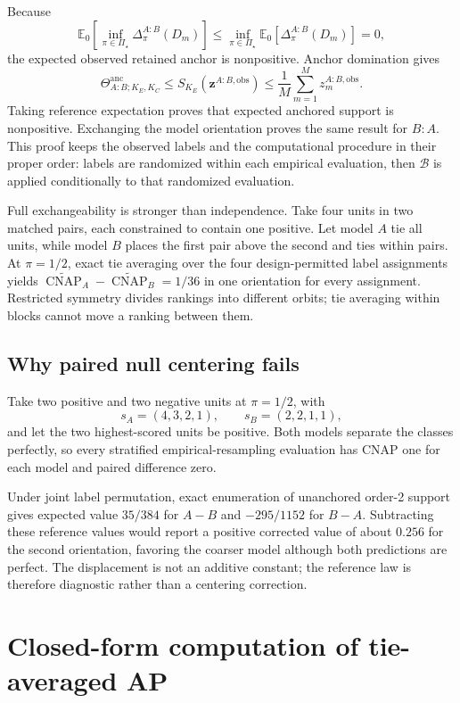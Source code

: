 \documentclass[11pt]{article}
\newcommand{\CNAP}{\operatorname{CNAP}}
\newcommand{\PSet}{\Pi_\star}
\newcommand{\Boot}{\mathcal{B}}
\newcommand{\E}{\mathbb{E}}
\newcommand{\CNAPta}{\widetilde{\CNAP}}
\newcommand{\Thetaanc}{\Theta^{\mathrm{anc}}}
\theoremstyle{remark}
\begin{document}
Because
\[
\E_0\!\left[
\inf_{\pi\in\PSet}\Delta^{A:B}_\pi(D_m)
\right]
\leq
\inf_{\pi\in\PSet}
\E_0[\Delta^{A:B}_\pi(D_m)]
=0,
\]
the expected observed retained anchor is nonpositive. Anchor domination gives
\[
\Thetaanc_{A:B;K_E,K_C}
\leq
S_{K_E}(\mathbf z^{A:B,\mathrm{obs}})
\leq
\frac1M\sum_{m=1}^Mz_m^{A:B,\mathrm{obs}}.
\]
Taking reference expectation proves that expected anchored support is
nonpositive. Exchanging the model orientation proves the same result for
$B:A$. This proof keeps the observed labels and the computational procedure in
their proper order: labels are randomized within each empirical evaluation,
then $\Boot$ is applied conditionally to that randomized evaluation.

Full exchangeability is stronger than independence. Take four units in two
matched pairs, each constrained to contain one positive. Let model $A$ tie all
units, while model $B$ places the first pair above the second and ties within
pairs. At $\pi=1/2$, exact tie averaging over the four design-permitted label
assignments yields $\CNAPta_A-\CNAPta_B=1/36$ in one orientation for every
assignment. Restricted symmetry divides rankings into different orbits; tie
averaging within blocks cannot move a ranking between them.

\subsection{Why paired null centering fails}

Take two positive and two negative units at $\pi=1/2$, with
\[
s_A=(4,3,2,1),
\qquad
s_B=(2,2,1,1),
\]
and let the two highest-scored units be positive. Both models separate the
classes perfectly, so every stratified empirical-resampling evaluation has
CNAP one for each model and paired difference zero.

Under joint label permutation, exact enumeration of unanchored order-2 support
gives expected value $35/384$ for $A-B$ and $-295/1152$ for $B-A$.
Subtracting these reference values would report a positive corrected value of
about $0.256$ for the second orientation, favoring the coarser model although
both predictions are perfect. The displacement is not an additive constant;
the reference law is therefore diagnostic rather than a centering correction.


\section{Closed-form computation of tie-averaged AP}
\label{app:tie-computation}
\end{document}

